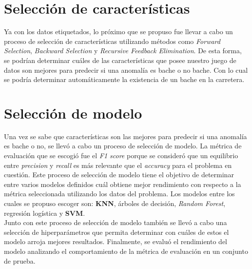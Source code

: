 \section{Selección de características}
	Ya con los datos etiquetados, lo próximo que se propuso fue llevar a cabo un proceso de selección de características utilizando métodos como
	\emph{Forward Selection}, \emph{Backward Selection} y \emph{Recursive Feedback Elimination}. De esta forma, se podrían determinar cuáles de las 
	características que posee nuestro juego de datos son mejores para predecir si una anomalía es bache o no bache. Con lo cual se podría determinar
	automáticamente la existencia de un bache en la carretera.

\section{Selección de modelo}
	Una vez se sabe que características son las mejores para predecir si una anomalía es bache o no, se llevó a cabo un proceso de selección de
	modelo. La métrica de evaluación que se escogió fue el \emph{F1 score} porque se consideró que un equilibrio entre \emph{precision} y
	\emph{recall} es más relevante que el \emph{accuracy} para el problema en cuestión. Este proceso de selección de modelo tiene el
	objetivo de determinar entre varios modelos definidos cuál obtiene mejor rendimiento con respecto a la métrica seleccionada utilizando los datos
	del problema. Los modelos entre los cuales se propuso escoger son: \textbf{KNN}, árboles de decisión, \emph{Random Forest}, regresión logística y
	\textbf{SVM}.\\
	\indent Junto con este proceso de selección de modelo también se llevó a cabo una selección de hiperparámetros que permita determinar con
	cuáles de estos el modelo arroja mejores resultados. Finalmente, se evaluó el rendimiento del modelo analizando el comportamiento de la métrica
	de evaluación en un conjunto de prueba.
